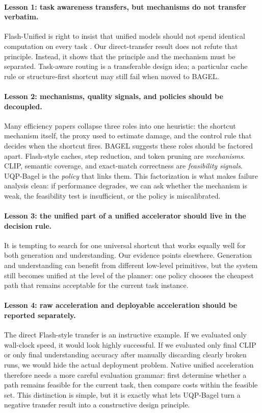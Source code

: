 \documentclass{article}
\begin{document}
\paragraph{Lesson 1: task awareness transfers, but mechanisms do not transfer verbatim.} Flash-Unified is right to insist that unified models should not spend identical computation on every task \citep{flash}. Our direct-transfer result does not refute that principle. Instead, it shows that the principle and the mechanism must be separated. Task-aware routing is a transferable design idea; a particular cache rule or structure-first shortcut may still fail when moved to BAGEL.

\paragraph{Lesson 2: mechanisms, quality signals, and policies should be decoupled.} Many efficiency papers collapse three roles into one heuristic: the shortcut mechanism itself, the proxy used to estimate damage, and the control rule that decides when the shortcut fires. BAGEL suggests these roles should be factored apart. Flash-style caches, step reduction, and token pruning are \emph{mechanisms}. CLIP, semantic coverage, and exact-match correctness are \emph{feasibility signals}. UQP-Bagel is the \emph{policy} that links them. This factorization is what makes failure analysis clean: if performance degrades, we can ask whether the mechanism is weak, the feasibility test is insufficient, or the policy is miscalibrated.

\paragraph{Lesson 3: the unified part of a unified accelerator should live in the decision rule.} It is tempting to search for one universal shortcut that works equally well for both generation and understanding. Our evidence points elsewhere. Generation and understanding can benefit from different low-level primitives, but the system still becomes unified at the level of the planner: one policy chooses the cheapest path that remains acceptable for the current task instance.

\paragraph{Lesson 4: raw acceleration and deployable acceleration should be reported separately.} The direct Flash-style transfer is an instructive example. If we evaluated only wall-clock speed, it would look highly successful. If we evaluated only final CLIP or only final understanding accuracy after manually discarding clearly broken runs, we would hide the actual deployment problem. Native unified acceleration therefore needs a more careful evaluation grammar: first determine whether a path remains feasible for the current task, then compare costs within the feasible set. This distinction is simple, but it is exactly what lets UQP-Bagel turn a negative transfer result into a constructive design principle.
\end{document}
